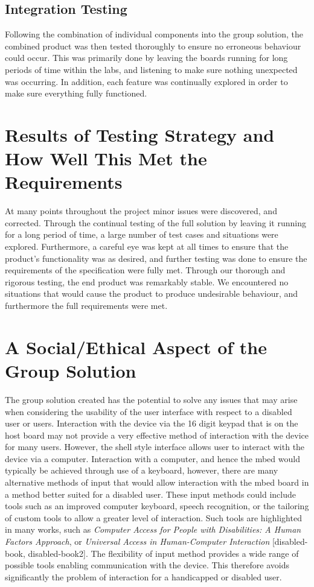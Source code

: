 \subsection*{Integration Testing}

Following the combination of individual components into the group solution, the 
combined product was then tested thoroughly to ensure no erroneous behaviour 
could occur. This was primarily done by leaving the boards running for long 
periods of time within the labs, and listening to make sure nothing unexpected 
was occurring. In addition, each feature was continually explored in order to 
make sure everything fully functioned.  

\section{Results of Testing Strategy and How Well This Met the Requirements}

At many points throughout the project minor issues were discovered, and corrected. 
Through the continual testing of the full solution by leaving it running for a 
long period of time, a large number of test cases and situations were explored.
Furthermore, a careful eye was kept at all times to ensure that the product's
functionality was as desired, and further testing was done to ensure the 
requirements of the specification were fully met.
Through our thorough and rigorous testing, the end product was remarkably stable. 
We encountered no situations that would cause the product to produce undesirable 
behaviour, and furthermore the full requirements were met.

\section{A Social/Ethical Aspect of the Group Solution} 

The group solution created has the potential to solve any issues that may arise 
when considering the usability of the user interface with respect to a disabled 
user or users. Interaction with the device via the 16 digit keypad that is on 
the host board may not provide a very effective method of interaction with the 
device for many users. However, the shell style interface allows user to interact 
with the device via a computer. Interaction with a computer, and hence the mbed 
would typically be achieved through use of a keyboard, however, there are many 
alternative methods of input that would allow interaction with the mbed board in 
a method better suited for a disabled user. These input methods could include 
tools such as an improved computer keyboard, speech recognition, or the tailoring 
of custom tools to allow a greater level of interaction. Such tools are 
highlighted in many works, such as \textit{Computer Access for People with 
Disabilities: A Human Factors Approach}, or \textit{Universal Access in 
Human-Computer Interaction} [disabled-book, disabled-book2]. The flexibility of 
input method provides a wide range of possible tools enabling communication with 
the device. This therefore avoids significantly the problem of interaction for 
a handicapped or disabled user. 
